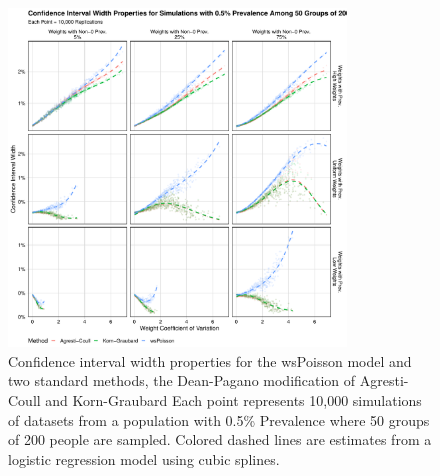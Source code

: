 \documentclass[AMA,STIX1COL]{WileyNJD-v2}
\begin{document}
\begin{figure}
\centering
\includegraphics[width=0.8\textwidth]{figures/perfect_confidence_interval_width_50_groups_0_005_prev}
\caption{Confidence interval width properties for the wsPoisson model and two standard methods, the Dean-Pagano modification of Agresti-Coull and Korn-Graubard
Each point represents 10,000 simulations of datasets from a population with 0.5\% Prevalence where 50 groups of 200 people are sampled.
Colored dashed lines are estimates from a logistic regression model using cubic splines.}
\label{fig:perfect_confidence_interval_width_50_groups_0_005_prev}
\end{figure}
\end{document}
